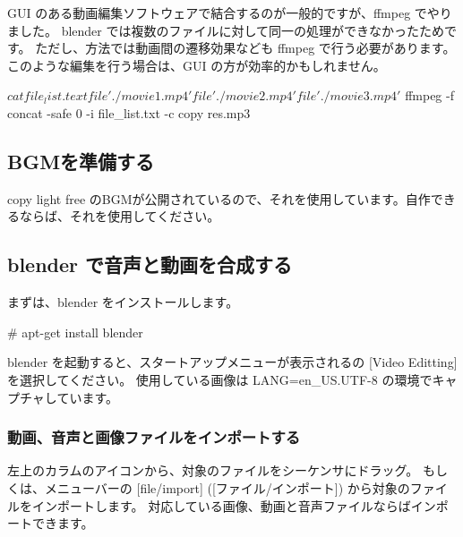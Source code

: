 \documentclass[mingoth,a4paper]{jsarticle}
\begin{document}
GUI のある動画編集ソフトウェアで結合するのが一般的ですが、ffmpeg でやりました。
blender では複数のファイルに対して同一の処理ができなかったためです。
ただし、方法では動画間の遷移効果なども ffmpeg で行う必要があります。
このような編集を行う場合は、GUI の方が効率的かもしれません。

\begin{commandline}
$ cat file_list.text
file './movie1.mp4'
file './movie2.mp4'
file './movie3.mp4'
$ ffmpeg -f concat -safe 0 -i file_list.txt -c copy res.mp3
\end{commandline}

%
%
%
%

\subsection{BGMを準備する}

copy light free のBGMが公開されているので、それを使用しています。自作できるならば、それを使用してください。	

\subsection{blender で音声と動画を合成する}

まずは、blender をインストールします。
\begin{commandline}
# apt-get install blender
\end{commandline}

blender を起動すると、スタートアップメニューが表示されるの [Video Editting]  を選択してください。
使用している画像は LANG=en\_US.UTF-8 の環境でキャプチャしています。

\subsubsection{動画、音声と画像ファイルをインポートする}

左上のカラムのアイコンから、対象のファイルをシーケンサにドラッグ。
もしくは、メニューバーの [file/import] ([ファイル/インポート]) から対象のファイルをインポートします。
対応している画像、動画と音声ファイルならばインポートできます。
\end{document}
